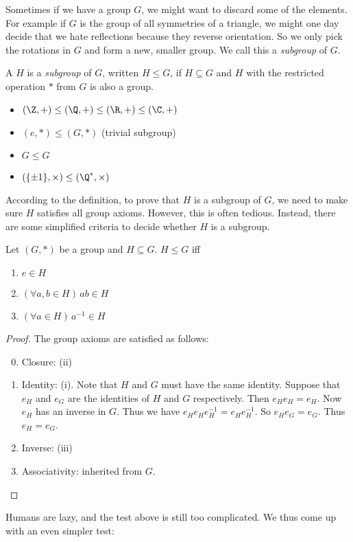 \documentclass[a4paper]{article}
\begin{document}
Sometimes if we have a group $G$, we might want to discard some of the elements. For example if $G$ is the group of all symmetries of a triangle, we might one day decide that we hate reflections because they reverse orientation. So we only pick the rotations in $G$ and form a new, smaller group. We call this a \emph{subgroup} of $G$.

\begin{defi}[Subgroup]
  A $H$ is a \emph{subgroup} of $G$, written $H\leq G$, if $H\subseteq G$ and $H$ with the restricted operation $*$ from $G$ is also a group.
\end{defi}
\begin{eg}\leavevmode
  \begin{itemize}
    \item $(\Z, +)\leq (\Q, +) \leq (\R, +)\leq (\C, +)$
    \item $({e}, *) \leq (G, *)$ (trivial subgroup)
    \item $G \leq G$
    \item $(\{\pm 1\}, \times) \leq (\Q^*, \times)$
  \end{itemize}
\end{eg}

According to the definition, to prove that $H$ is a subgroup of $G$, we need to make sure $H$ satisfies all group axioms. However, this is often tedious. Instead, there are some simplified criteria to decide whether $H$ is a subgroup.
\begin{lemma}
  Let $(G, *)$ be a group and $H\subseteq G$. $H \leq G$ iff
  \begin{enumerate}
    \item $e \in H$
    \item $(\forall a, b\in H)\,ab \in H$
    \item $(\forall a \in H)\,a^{-1} \in H$
  \end{enumerate}
\end{lemma}
\begin{proof}
  The group axioms are satisfied as follows:
  \begin{enumerate}[label=\arabic{*}.]
      \setcounter{enumi}{-1}
    \item Closure: (ii)
    \item Identity: (i). Note that $H$ and $G$ must have the same identity. Suppose that $e_H$ and $e_G$ are the identities of $H$ and $G$ respectively. Then $e_He_H = e_H$. Now $e_H$ has an inverse in $G$. Thus we have $e_He_He_H^{-1} = e_He_H^{-1}$. So $e_He_G = e_G$. Thus $e_H = e_G$.
    \item Inverse: (iii)
    \item Associativity: inherited from $G$.
  \end{enumerate}
\end{proof}
Humans are lazy, and the test above is still too complicated. We thus come up with an even simpler test:
\end{document}
